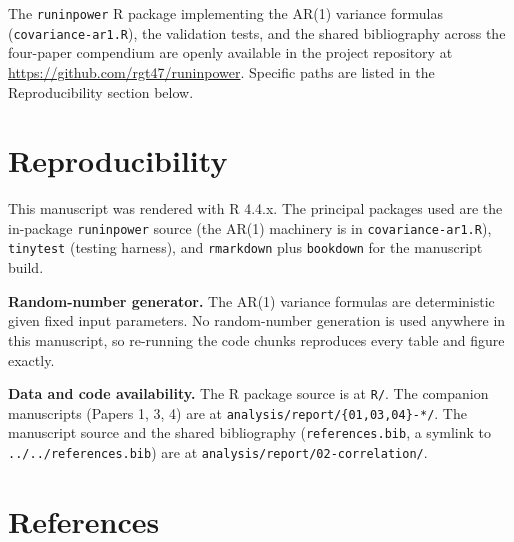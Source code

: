 \documentclass[
  11pt,
]{article}
\begin{document}
The \texttt{runinpower} R package implementing the AR(1)
variance formulas (\texttt{covariance-ar1.R}), the validation
tests, and the shared bibliography across the four-paper
compendium are openly available in the project repository
at
\url{https://github.com/rgt47/runinpower}.
Specific paths are listed in the Reproducibility section
below.

\section{Reproducibility}\label{reproducibility}

This manuscript was rendered with R 4.4.x. The principal
packages used are the in-package \texttt{runinpower} source (the
AR(1) machinery is in \texttt{covariance-ar1.R}), \texttt{tinytest}
(testing harness), and \texttt{rmarkdown} plus \texttt{bookdown} for the
manuscript build.

\textbf{Random-number generator.} The AR(1) variance formulas
are deterministic given fixed input parameters. No
random-number generation is used anywhere in this
manuscript, so re-running the code chunks reproduces
every table and figure exactly.

\textbf{Data and code availability.} The R package source is
at \texttt{R/}. The companion manuscripts (Papers 1, 3, 4) are at
\texttt{analysis/report/\{01,03,04\}-*/}. The manuscript source and
the shared bibliography (\texttt{references.bib}, a symlink to
\texttt{../../references.bib}) are at
\texttt{analysis/report/02-correlation/}.

\section{References}\label{references}
\end{document}
